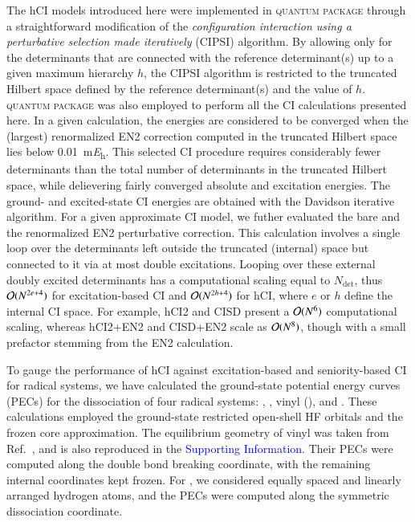 \documentclass[aip,jcp,reprint,noshowkeys,superscriptaddress]{revtex4-1}
\newcommand{\SupInf}{\textcolor{blue}{Supporting Information}}
\newcommand{\QP}{\textsc{quantum package}}
\newcommand{\Ndet}{N_\text{det}}
\begin{document}
The hCI models introduced here were implemented in {\QP} \cite{Garniron_2019} through a straightforward modification of the
\textit{configuration interaction using a perturbative selection made iteratively} (CIPSI) algorithm. \cite{Huron_1973,Giner_2013,Giner_2015,Garniron_2018}
By allowing only for the determinants that are connected with the reference determinant(s) up to a given maximum hierarchy $h$,
the CIPSI algorithm is restricted to the truncated Hilbert space defined by the reference determinant(s) and the value of $h$.
{\QP} \cite{Garniron_2019} was also employed to perform all the CI calculations presented here.
In a given calculation, the energies are considered to be converged when the (largest) renormalized EN2 correction computed in the truncated Hilbert space 
lies below \SI{0.01}{\milli\hartree}. \cite{Garniron_2018}
This selected CI procedure requires considerably fewer determinants than the total number of determinants in the truncated Hilbert space,
while delievering fairly converged absolute and excitation energies.
The ground- and excited-state CI energies are obtained with the Davidson iterative algorithm. \cite{Davidson_1975}
For a given approximate CI model, we futher evaluated the bare and the renormalized EN2 perturbative correction. \cite{Garniron_2019} 
This calculation involves a single loop over the determinants left outside the truncated (internal) space but connected to it via at most double excitations.
Looping over these external doubly excited determinants has a computational scaling equal to $\Ndet$,
thus $\order*{N^{2e+4}}$ for excitation-based CI and $\order*{N^{2h+4}}$ for hCI, where $e$ or $h$ define the internal CI space.
For example, hCI2 and CISD present a $\order*{N^6}$ computational scaling, whereas hCI2+EN2 and CISD+EN2 scale as $\order*{N^8}$,
though with a small prefactor stemming from the EN2 calculation.

To gauge the performance of hCI against excitation-based and seniority-based CI for radical systems,
we have calculated the ground-state potential energy curves (PECs) for the dissociation of four radical systems:
, , vinyl (), and .
These calculations employed the ground-state restricted open-shell HF orbitals and the frozen core approximation.
The equilibrium geometry of vinyl was taken from Ref.~,
and is also reproduced in the {\SupInf}.
Their PECs were computed along the  double bond breaking coordinate, with the remaining internal coordinates kept frozen.
For , we considered equally spaced and linearly arranged hydrogen atoms, and the PECs were computed along the symmetric dissociation coordinate.
\end{document}
